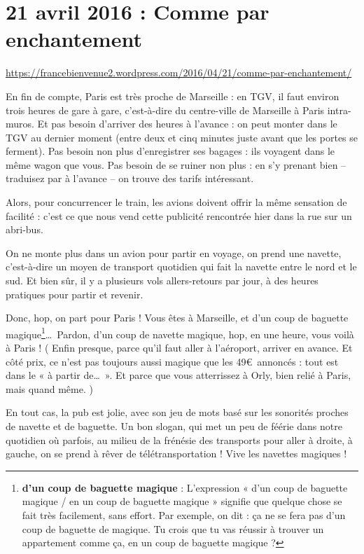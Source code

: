 \documentclass[11pt, french]{report}
\begin{document}
\chapter{21 avril 2016 : Comme par enchantement}

\url{https://francebienvenue2.wordpress.com/2016/04/21/comme-par-enchantement/}

\vfill

En fin de compte, Paris est très proche de Marseille : en TGV, il faut environ
trois heures de gare à gare, c'est-à-dire du centre-ville de Marseille à Paris
intra-muros. Et pas besoin d'arriver des heures à l'avance : on peut monter
dans le TGV au dernier moment (entre deux et cinq minutes juste avant que les
portes se ferment).  Pas besoin non plus d'enregistrer ses bagages : ils
voyagent dans le même wagon que vous. Pas besoin de se ruiner non plus : en
s'y prenant bien -- traduisez par à l'avance -- on trouve des tarifs
intéressant.

Alors, pour concurrencer le train, les avions doivent offrir la même sensation
de facilité : c’est ce que nous vend cette publicité rencontrée hier dans la
rue sur un abri-bus.

On ne monte plus dans un avion pour partir en voyage, on prend une navette,
c’est-à-dire un moyen de transport quotidien qui fait la navette entre le nord
et le sud. Et bien sûr, il y a plusieurs vols allers-retours par jour, à des
heures pratiques pour partir et revenir.

Donc, hop, on part pour Paris ! Vous êtes à Marseille, et d’un coup de baguette
magique\footnote{\textbf{d’un coup de baguette magique} : L’expression
  « d’un coup de baguette magique / en un coup de baguette magique » signifie
  que quelque chose se fait très facilement, sans effort.
  Par exemple, on dit : ça ne se fera pas d’un coup de baguette de magique.
  Tu crois que tu vas réussir à trouver un appartement comme ça, en un coup de
  baguette magique ? }\ldots\ Pardon, d’un coup de navette magique, hop, en
une heure, vous voilà à Paris ! ( Enfin presque, parce qu’il faut aller à
l’aéroport, arriver en avance. Et côté prix, ce n’est pas toujours aussi
magique que les 49\euro\ annoncés : tout est dans le « à partir de\ldots\ ». Et
parce que vous atterrissez à Orly, bien relié à Paris, mais quand même. )

En tout cas, la pub est jolie, avec son jeu de mots basé sur les sonorités
proches de navette et de baguette. Un bon slogan, qui met un peu de féérie dans
notre quotidien où parfois, au milieu de la frénésie des transports pour aller
à droite, à gauche, on se prend à rêver de télétransportation ! Vive les
navettes magiques ! 
\end{document}
